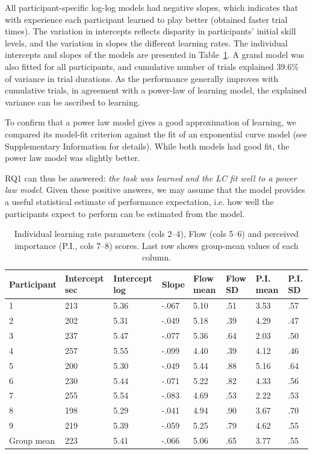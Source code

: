 \documentclass[fleqn,10pt]{wlscirep}
\begin{document}
All participant-specific log-log models had negative slopes, which indicates that with experience each participant learned to play better (obtained faster trial times). The variation in intercepts reflects disparity in participants’ initial skill levels, and the variation in slopes the different learning rates. The individual intercepts and slopes of the models are presented in Table~\ref{tab:LCxFlow}. A grand model was also fitted for all participants, and cumulative number of trials explained 39.6\% of variance in trial durations. As the performance generally improves with cumulative trials, in agreement with a power-law of learning model, the explained variance can be ascribed to learning.

To confirm that a power law model gives a good approximation of learning, we compared its model-fit criterion against the fit of an exponential curve model (see Supplementary Information for details). While both models had good fit, the power law model was slightly better.

RQ1 can thus be answered: {\it the task was learned and the LC fit well to a power law model}. Given these positive answers, we may assume that the model provides a useful statistical estimate of performance expectation, i.e. how well the participants expect to perform can be estimated from the model.

\begin{table}[ht]
\centering
\caption{\label{tab:LCxFlow}Individual learning rate parameters (cols 2--4), Flow (cols 5--6) and perceived importance (P.I., cols 7--8) scores. Last row shows group-mean values of each column.}
\begin{tabular}{llllllll}
\hline
Participant & Intercept sec & Intercept log & Slope  & Flow mean & Flow SD & P.I. mean & P.I. SD \\
\hline
1           & 213     & 5.36      & -.067 & 5.10      & .51     & 3.53      & .57     \\
2           & 202     & 5.31      & -.049 & 5.18      & .39     & 4.29      & .47     \\
3           & 237     & 5.47      & -.077 & 5.36      & .64     & 2.03      & .50     \\
4           & 257     & 5.55      & -.099 & 4.40      & .39     & 4.12      & .46     \\
5           & 200     & 5.30      & -.049 & 5.44      & .88     & 5.16      & .64     \\
6           & 230     & 5.44      & -.071 & 5.22      & .82     & 4.33      & .56     \\
7           & 255     & 5.54      & -.083 & 4.69      & .53     & 2.22      & .53     \\
8           & 198     & 5.29      & -.041 & 4.94      & .90     & 3.67      & .70     \\
9           & 219     & 5.39      & -.059 & 5.25      & .79     & 4.62      & .55     \\
\hline
Group mean  & 223     & 5.41      & -.066 & 5.06      & .65    & 3.77      & .55    \\
\hline
\end{tabular}
\end{table}
\end{document}
